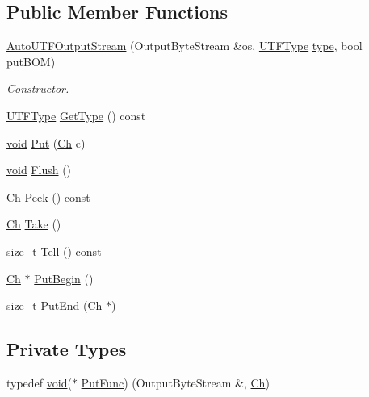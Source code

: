 \subsection*{Public Member Functions}
\begin{DoxyCompactItemize}
\item 
\hyperlink{classAutoUTFOutputStream_a2fe7dbc8e43d11295f66df5653148137}{Auto\+U\+T\+F\+Output\+Stream} (Output\+Byte\+Stream \&os, \hyperlink{encodings_8h_ac9448aedf514a5bb509bae73a9ce4e58}{U\+T\+F\+Type} \hyperlink{imgui__impl__opengl3__loader_8h_a63267399cd2a2ee217572c11d2e54f07}{type}, bool put\+B\+OM)
\begin{DoxyCompactList}\small\item\em Constructor. \end{DoxyCompactList}\item 
\hyperlink{encodings_8h_ac9448aedf514a5bb509bae73a9ce4e58}{U\+T\+F\+Type} \hyperlink{classAutoUTFOutputStream_a62091565a8103d69002be2e2f4f0ba2c}{Get\+Type} () const
\item 
\hyperlink{imgui__impl__opengl3__loader_8h_ac668e7cffd9e2e9cfee428b9b2f34fa7}{void} \hyperlink{classAutoUTFOutputStream_ad12b33e48c45bdbf2628fd3d5461041a}{Put} (\hyperlink{classAutoUTFOutputStream_abd8c486101026e11828e86c18991c9c0}{Ch} c)
\item 
\hyperlink{imgui__impl__opengl3__loader_8h_ac668e7cffd9e2e9cfee428b9b2f34fa7}{void} \hyperlink{classAutoUTFOutputStream_a38b54c84ba0c479552256ac092529f47}{Flush} ()
\item 
\hyperlink{classAutoUTFOutputStream_abd8c486101026e11828e86c18991c9c0}{Ch} \hyperlink{classAutoUTFOutputStream_ad706f62fd5d22967e5949f3a05087e4e}{Peek} () const
\item 
\hyperlink{classAutoUTFOutputStream_abd8c486101026e11828e86c18991c9c0}{Ch} \hyperlink{classAutoUTFOutputStream_a44ee7d84ba13fece17574d01b7be574b}{Take} ()
\item 
size\+\_\+t \hyperlink{classAutoUTFOutputStream_a81acbe33d84a28b7d5040d576ae22b5a}{Tell} () const
\item 
\hyperlink{classAutoUTFOutputStream_abd8c486101026e11828e86c18991c9c0}{Ch} $\ast$ \hyperlink{classAutoUTFOutputStream_a3c7333661dba3d2210f0b287bdd6c1f3}{Put\+Begin} ()
\item 
size\+\_\+t \hyperlink{classAutoUTFOutputStream_a4b16bda191526c894501fce447e95b8d}{Put\+End} (\hyperlink{classAutoUTFOutputStream_abd8c486101026e11828e86c18991c9c0}{Ch} $\ast$)
\end{DoxyCompactItemize}
\subsection*{Private Types}
\begin{DoxyCompactItemize}
\item 
typedef \hyperlink{imgui__impl__opengl3__loader_8h_ac668e7cffd9e2e9cfee428b9b2f34fa7}{void}($\ast$ \hyperlink{classAutoUTFOutputStream_a398450792738ee1cb865fc96dfde9e1a}{Put\+Func}) (Output\+Byte\+Stream \&, \hyperlink{classAutoUTFOutputStream_abd8c486101026e11828e86c18991c9c0}{Ch})
\end{DoxyCompactItemize}
